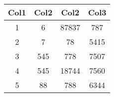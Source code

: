 \documentclass{article}
\begin{document}
\begin{center}
    \begin{tabular}{||c c c c||} 
    \hline
    Col1 & Col2 & Col2 & Col3 \\ [0.5ex] 
    \hline\hline
    1 & 6 & 87837 & 787 \\ 
    \hline
    2 & 7 & 78 & 5415 \\
    \hline
    3 & 545 & 778 & 7507 \\
    \hline
    4 & 545 & 18744 & 7560 \\
    \hline
    5 & 88 & 788 & 6344 \\ [1ex] 
    \hline
   \end{tabular}
   \end{center}
\end{document}
